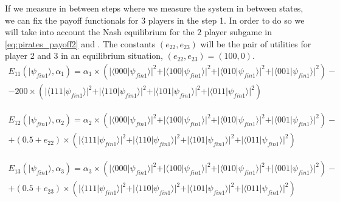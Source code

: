 If we measure in between steps where we measure the system in between states, we can fix the payoff functionals for $3$ players in the step 1. In order to do so we will take into account the Nash equilibrium for the $2$ player subgame in \ref{eq:pirates_payoff2} and \label{eq:pirates_payoff3}. The constants $(e_{22}, e_{23})$ will be the pair of utilities for player 2 and 3 in an equilibrium situation, $(e_{22}, e_{23})=(100, 0)$.  
 \begin{equation}
\begin{split}
E_{11}(\vert\psi_{fin1}\rangle, \alpha_{1})=\alpha_{1}\times(\vert\langle000\vert\psi_{fin1}\rangle\vert^{2} + \vert\langle100\vert\psi_{fin1}\rangle\vert^{2}
+ \vert\langle010\vert\psi_{fin1}\rangle\vert^{2}
+ \vert\langle001\vert\psi_{fin1}\rangle\vert^{2}
 ) - \\
 - 200\times(\vert\langle111\vert\psi_{fin1}\rangle\vert^{2} + \vert\langle110\vert\psi_{fin1}\rangle\vert^{2}
+ \vert\langle101\vert\psi_{fin1}\rangle\vert^{2}
+ \vert\langle011\vert\psi_{fin1}\rangle\vert^{2}
 )
\end{split}
\end{equation}

 \begin{equation}
\begin{split}
E_{12}(\vert\psi_{fin1}\rangle, \alpha_{2})=\alpha_{2}\times(\vert\langle000\vert\psi_{fin1}\rangle\vert^{2} + \vert\langle100\vert\psi_{fin1}\rangle\vert^{2}
+ \vert\langle010\vert\psi_{fin1}\rangle\vert^{2}
+ \vert\langle001\vert\psi_{fin1}\rangle\vert^{2}
 ) - \\
 + (0.5 + e_{22})\times(\vert\langle111\vert\psi_{fin1}\rangle\vert^{2} + \vert\langle110\vert\psi_{fin1}\rangle\vert^{2}
+ \vert\langle101\vert\psi_{fin1}\rangle\vert^{2}
+ \vert\langle011\vert\psi_{fin1}\rangle\vert^{2}
 )
\end{split}
\label{eq:pirates_payoff2}
\end{equation}

 \begin{equation}
\begin{split}
E_{13}(\vert\psi_{fin1}\rangle, \alpha_{3})=\alpha_{3}\times(\vert\langle000\vert\psi_{fin1}\rangle\vert^{2} + \vert\langle100\vert\psi_{fin1}\rangle\vert^{2}
+ \vert\langle010\vert\psi_{fin1}\rangle\vert^{2}
+ \vert\langle001\vert\psi_{fin1}\rangle\vert^{2}
 ) - \\
 + (0.5 + e_{23})\times(\vert\langle111\vert\psi_{fin1}\rangle\vert^{2} + \vert\langle110\vert\psi_{fin1}\rangle\vert^{2}
+ \vert\langle101\vert\psi_{fin1}\rangle\vert^{2}
+ \vert\langle011\vert\psi_{fin1}\rangle\vert^{2}
 )
\end{split}
\label{eq:pirates_payoff3}
\end{equation}


